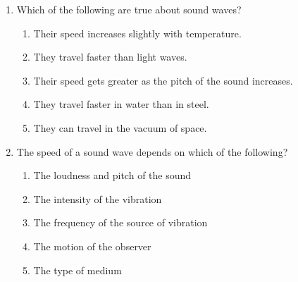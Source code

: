 \documentclass{../../../oss-apphys}
\begin{document}
\begin{multicols}{2}
\begin{enumerate}[leftmargin=18pt,resume]
    
%    
    
  \item Which of the following are true about sound waves?
    \label{multi-1st}
    \begin{enumerate}[nosep,leftmargin=18pt,label=(\Alph*)]
    \item Their speed increases slightly with temperature.
    \item They travel faster than light waves.
    \item Their speed gets greater as the pitch of the sound increases.
    \item They travel faster in water than in steel.
    \item They can travel in the vacuum of space.
    \end{enumerate}
    \vspace{.7in}
    
    
  \item The speed of a sound wave depends on which of the following?
    \begin{enumerate}[nosep,leftmargin=18pt,label=(\Alph*)]
    \item The loudness and pitch of the sound
    \item The intensity of the vibration
    \item The frequency of the source of vibration
    \item The motion of the observer
    \item The type of medium
    \end{enumerate}
    \columnbreak


\end{enumerate}
\end{multicols}
\end{document}

